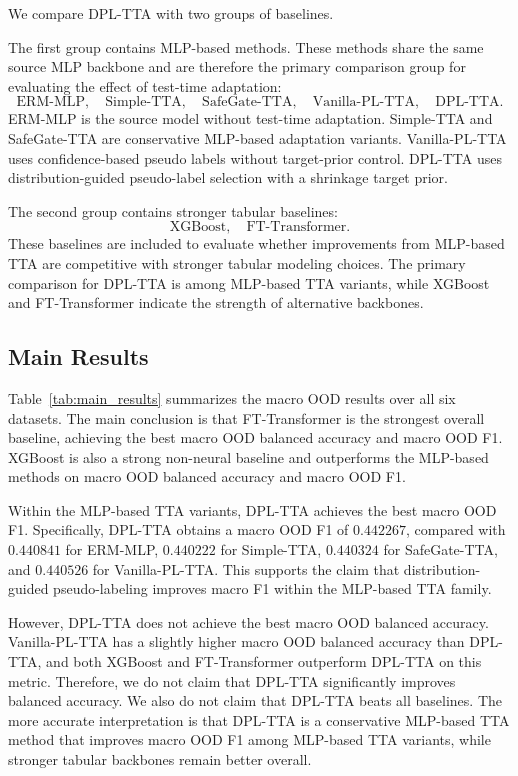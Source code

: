 We compare DPL-TTA with two groups of baselines.

The first group contains MLP-based methods. These methods share the same source MLP backbone and are therefore the primary comparison group for evaluating the effect of test-time adaptation:
\[
\text{ERM-MLP}, \quad
\text{Simple-TTA}, \quad
\text{SafeGate-TTA}, \quad
\text{Vanilla-PL-TTA}, \quad
\text{DPL-TTA}.
\]
ERM-MLP is the source model without test-time adaptation. Simple-TTA and SafeGate-TTA are conservative MLP-based adaptation variants. Vanilla-PL-TTA uses confidence-based pseudo labels without target-prior control. DPL-TTA uses distribution-guided pseudo-label selection with a shrinkage target prior.

The second group contains stronger tabular baselines:
\[
\text{XGBoost}, \quad \text{FT-Transformer}.
\]
These baselines are included to evaluate whether improvements from MLP-based TTA are competitive with stronger tabular modeling choices. The primary comparison for DPL-TTA is among MLP-based TTA variants, while XGBoost and FT-Transformer indicate the strength of alternative backbones.

\subsection{Main Results}

Table~\ref{tab:main_results} summarizes the macro OOD results over all six datasets. The main conclusion is that FT-Transformer is the strongest overall baseline, achieving the best macro OOD balanced accuracy and macro OOD F1. XGBoost is also a strong non-neural baseline and outperforms the MLP-based methods on macro OOD balanced accuracy and macro OOD F1.

Within the MLP-based TTA variants, DPL-TTA achieves the best macro OOD F1. Specifically, DPL-TTA obtains a macro OOD F1 of $0.442267$, compared with $0.440841$ for ERM-MLP, $0.440222$ for Simple-TTA, $0.440324$ for SafeGate-TTA, and $0.440526$ for Vanilla-PL-TTA. This supports the claim that distribution-guided pseudo-labeling improves macro F1 within the MLP-based TTA family.

However, DPL-TTA does not achieve the best macro OOD balanced accuracy. Vanilla-PL-TTA has a slightly higher macro OOD balanced accuracy than DPL-TTA, and both XGBoost and FT-Transformer outperform DPL-TTA on this metric. Therefore, we do not claim that DPL-TTA significantly improves balanced accuracy. We also do not claim that DPL-TTA beats all baselines. The more accurate interpretation is that DPL-TTA is a conservative MLP-based TTA method that improves macro OOD F1 among MLP-based TTA variants, while stronger tabular backbones remain better overall.

